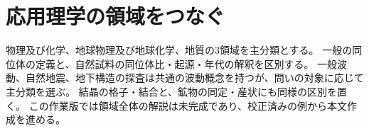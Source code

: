 \chapter{応用理学の領域をつなぐ}
物理及び化学、地球物理及び地球化学、地質の3領域を主分類とする。
一般の同位体の定義と、自然試料の同位体比・起源・年代の解釈を区別する。
一般波動、自然地震、地下構造の探査は共通の波動概念を持つが、問いの対象に応じて主分類を選ぶ。
結晶の格子・結合と、鉱物の同定・産状にも同様の区別を置く。
この作業版では領域全体の解説は未完成であり、校正済みの例から本文作成を進める。
